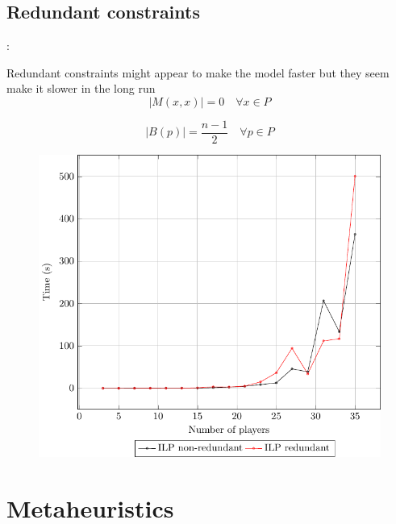 \documentclass[9pt, aspectratio=169, xcolor=table]{beamer}
\begin{document}
\subsection{Redundant constraints}
\begin{frame}{\secname: \subsecname}
    \begin{minipage}{0.40\textwidth}
	Redundant constraints might appear to make the model faster but they seem make it slower in the long run
	\begin{equation*}
	    \label{noselfplay}
	    |M(x,x)| = 0 \quad \forall x \in P 
	\end{equation*}

	\begin{equation*}
	    \label{blackfairness}
	    |B(p)| = \frac{n-1}{2} \quad \forall p \in P
	\end{equation*}

    \end{minipage}
    \hfill
    \begin{minipage}{0.57\textwidth}
	\begin{figure}[h]
	    \includegraphics[width=\linewidth]{../plots/time_per_instance.pdf}
	\end{figure}
    \end{minipage}

\end{frame}

\section{Metaheuristics}
\end{document}
